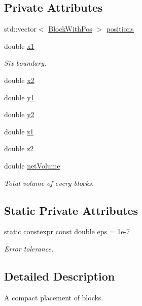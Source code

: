 \subsection*{Private Attributes}
\begin{DoxyCompactItemize}
\item 
std\+::vector$<$ \hyperlink{structPlacement_1_1BlockWithPos}{Block\+With\+Pos} $>$ \hyperlink{classPlacement_a5c4c9527336f2c2c18e2c6234aad8878}{positions}
\item 
double \hyperlink{classPlacement_a7061408d3dac137528697314b5825daf}{x1}
\begin{DoxyCompactList}\small\item\em Six boundary. \end{DoxyCompactList}\item 
double \hyperlink{classPlacement_acb44c4ead672e30af3b6cf3758db090c}{x2}
\item 
double \hyperlink{classPlacement_a4c17ed499418886700bf8e4d4ee45047}{y1}
\item 
double \hyperlink{classPlacement_ae7b89409ab130ba3d7c268faf7175b40}{y2}
\item 
double \hyperlink{classPlacement_a3e9d90f2d85b6641d2fd7d74d2600394}{z1}
\item 
double \hyperlink{classPlacement_aed710205286315a2a14f8cc2ceacd267}{z2}
\item 
double \hyperlink{classPlacement_afe51f89ddfdb2d27b68449d96f50e24d}{net\+Volume}
\begin{DoxyCompactList}\small\item\em Total volume of every blocks. \end{DoxyCompactList}\end{DoxyCompactItemize}
\subsection*{Static Private Attributes}
\begin{DoxyCompactItemize}
\item 
static constexpr const double \hyperlink{classPlacement_a8af99bcb7758493e48ac8270023f96d7}{eps} = 1e-\/7
\begin{DoxyCompactList}\small\item\em Error tolerance. \end{DoxyCompactList}\end{DoxyCompactItemize}


\subsection{Detailed Description}
A compact placement of blocks. 

